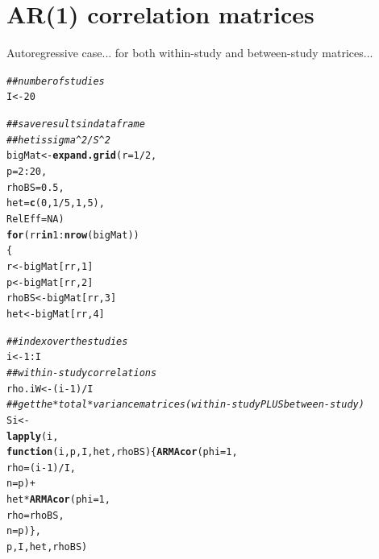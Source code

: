 \documentclass{article}\usepackage[]{graphicx}\usepackage[]{color}
\makeatletter
\newcommand{\hlnum}[1]{\textcolor[rgb]{0.686,0.059,0.569}{#1}}%
\newcommand{\hlcom}[1]{\textcolor[rgb]{0.678,0.584,0.686}{\textit{#1}}}%
\newcommand{\hlopt}[1]{\textcolor[rgb]{0,0,0}{#1}}%
\newcommand{\hlstd}[1]{\textcolor[rgb]{0.345,0.345,0.345}{#1}}%
\newcommand{\hlkwa}[1]{\textcolor[rgb]{0.161,0.373,0.58}{\textbf{#1}}}%
\newcommand{\hlkwb}[1]{\textcolor[rgb]{0.69,0.353,0.396}{#1}}%
\newcommand{\hlkwc}[1]{\textcolor[rgb]{0.333,0.667,0.333}{#1}}%
\newcommand{\hlkwd}[1]{\textcolor[rgb]{0.737,0.353,0.396}{\textbf{#1}}}%
\newenvironment{kframe}{%
 \def\at@end@of@kframe{}%
 \ifinner\ifhmode%
  \def\at@end@of@kframe{\end{minipage}}%
  \begin{minipage}{\columnwidth}%
 \fi\fi%
 \def\FrameCommand##1{\hskip\@totalleftmargin \hskip-\fboxsep
 \colorbox{shadecolor}{##1}\hskip-\fboxsep
     \hskip-\linewidth \hskip-\@totalleftmargin \hskip\columnwidth}%
 \MakeFramed {\advance\hsize-\width
   \@totalleftmargin\z@ \linewidth\hsize
   \@setminipage}}%
 {\par\unskip\endMakeFramed%
 \at@end@of@kframe}
\newenvironment{knitrout}{}{} %
\makeatother
\begin{document}
\section{AR(1) correlation matrices}

Autoregressive case... for both within-study and between-study matrices...

\begin{knitrout}
\color{fgcolor}\begin{kframe}
\begin{alltt}
\hlcom{##number of studies}
\hlstd{I} \hlkwb{<-} \hlnum{20}

\hlcom{##save results in data frame}
\hlcom{##het is sigma^2/S^2}
\hlstd{bigMat} \hlkwb{<-} \hlkwd{expand.grid}\hlstd{(}\hlkwc{r} \hlstd{=} \hlnum{1}\hlopt{/}\hlnum{2}\hlstd{,}
                      \hlkwc{p} \hlstd{=} \hlnum{2}\hlopt{:}\hlnum{20}\hlstd{,}
                      \hlkwc{rhoBS}\hlstd{=}\hlnum{0.5}\hlstd{,}
                      \hlkwc{het} \hlstd{=} \hlkwd{c}\hlstd{(}\hlnum{0}\hlstd{,} \hlnum{1}\hlopt{/}\hlnum{5}\hlstd{,} \hlnum{1}\hlstd{,} \hlnum{5}\hlstd{),}
                      \hlkwc{RelEff} \hlstd{=} \hlnum{NA}\hlstd{)}
\hlkwa{for}\hlstd{(rr} \hlkwa{in} \hlnum{1}\hlopt{:}\hlkwd{nrow}\hlstd{(bigMat))}
\hlstd{\{}
    \hlstd{r} \hlkwb{<-} \hlstd{bigMat[rr,} \hlnum{1}\hlstd{]}
    \hlstd{p} \hlkwb{<-} \hlstd{bigMat[rr,} \hlnum{2}\hlstd{]}
    \hlstd{rhoBS} \hlkwb{<-} \hlstd{bigMat[rr,} \hlnum{3}\hlstd{]}
    \hlstd{het} \hlkwb{<-} \hlstd{bigMat[rr,} \hlnum{4}\hlstd{]}

    \hlcom{##index over the studies}
    \hlstd{i} \hlkwb{<-} \hlnum{1}\hlopt{:}\hlstd{I}
    \hlcom{##within-study correlations}
    \hlstd{rho.iW} \hlkwb{<-} \hlstd{(i}\hlopt{-}\hlnum{1}\hlstd{)}\hlopt{/}\hlstd{I}
    \hlcom{##get the *total* variance matrices (within-study PLUS between-study)}
    \hlstd{Si} \hlkwb{<-}
      \hlkwd{lapply}\hlstd{(i,}
             \hlkwa{function}\hlstd{(}\hlkwc{i}\hlstd{,} \hlkwc{p}\hlstd{,} \hlkwc{I}\hlstd{,} \hlkwc{het}\hlstd{,} \hlkwc{rhoBS}\hlstd{)\{}\hlkwd{ARMAcor}\hlstd{(}\hlkwc{phi}\hlstd{=}\hlnum{1}\hlstd{,}
                                                   \hlkwc{rho}\hlstd{=(i}\hlopt{-}\hlnum{1}\hlstd{)}\hlopt{/}\hlstd{I,}
                                                   \hlkwc{n}\hlstd{=p)} \hlopt{+}
                 \hlstd{het} \hlopt{*} \hlkwd{ARMAcor}\hlstd{(}\hlkwc{phi}\hlstd{=}\hlnum{1}\hlstd{,}
                               \hlkwc{rho}\hlstd{=rhoBS,}
                               \hlkwc{n}\hlstd{=p) \},}
             \hlstd{p, I, het, rhoBS)}


\end{alltt}
\end{kframe}
\end{knitrout}
\end{document}
